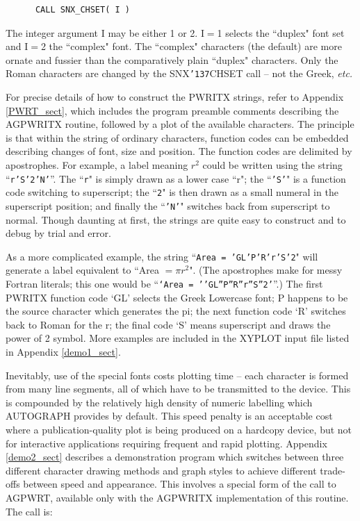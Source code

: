 \documentclass[11pt]{article}
\renewcommand{\_}{{\tt\char'137}}     %
\begin{document}
\begin{verbatim}
      CALL SNX_CHSET( I )
\end{verbatim}

The integer argument I may be either 1 or 2.
I$=$1 selects the ``duplex" font set and I$=$2 the ``complex" font.
The ``complex" characters (the default) are more ornate and
fussier than the comparatively plain ``duplex" characters.
Only the Roman characters are changed by the SNX\_CHSET call --
not the Greek, {\em etc.}

For precise details of how to construct the PWRITX strings, refer to Appendix
\ref{PWRT_sect}, which includes the program preamble comments describing the
AGPWRITX routine, followed by a plot of the available characters.
The principle is that within the string of ordinary characters, function codes
can be embedded describing changes of font, size and position.
The function codes are delimited by apostrophes.
For example, a label meaning $r^{2}$ could be written using the string
``{\tt r'S'2'N'}''.
The ``{\tt r}" is simply drawn as a lower case ``r"; the ``{\tt 'S'}" is a
function code switching to superscript; the ``{\tt 2}" is then drawn as a small
numeral in the superscript position; and finally the ``{\tt 'N'}" switches back
from superscript to normal.
Though daunting at first, the strings are quite easy to construct and to debug
by trial and error.

As a more complicated
example, the string ``{\tt Area = 'GL'P'R'r'S'2}" will generate a label
equivalent to ``Area $=\pi r^{2}$".
(The apostrophes make for messy Fortran literals; this one would be
``{\tt `Area = ''GL''P''R''r''S''2'}''.)
The first PWRITX function code `GL' selects the Greek Lowercase
font;  P happens to be the source character which generates the
pi;  the next function code `R' switches back to Roman for the
r;  the final code `S' means superscript and draws the power of 2 symbol.
More examples are included in the XYPLOT input file listed in Appendix
\ref{demo1_sect}.

Inevitably, use of the special fonts costs plotting time -- each
character is formed from many line segments, all of which have
to be transmitted to the device.
This is compounded by the relatively high density of
numeric labelling which AUTOGRAPH provides by default.
This speed penalty is an acceptable cost where a publication-quality
plot is being produced on a hardcopy device, but not for
interactive applications requiring frequent and rapid plotting.
Appendix \ref{demo2_sect} describes a demonstration program which
switches between three different character drawing
methods and graph styles to achieve different trade-offs
between speed and appearance.
This involves a special form of the call to AGPWRT, available
only with the AGPWRITX implementation of this routine.
The call is:
\end{document}
